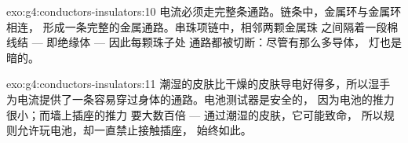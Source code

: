 \begin{solution}{exo:g4:conductors-insulators:10}
电流必须走完整条通路。链条中，金属环与金属环相连，
形成一条完整的金属通路。串珠项链中，相邻两颗金属珠
之间隔着一段棉线结 --- 即绝缘体 --- 因此每颗珠子处
通路都被切断：尽管有那么多导体，
灯也是暗的。
\end{solution}

\begin{solution}{exo:g4:conductors-insulators:11}
潮湿的皮肤比干燥的皮肤导电好得多，所以湿手
为电流提供了一条容易穿过身体的通路。电池测试器是安全的，
因为电池的推力很小；而墙上插座的推力
要大数百倍 --- 通过潮湿的皮肤，它可能致命，
所以规则允许玩电池，却一直禁止接触插座，
始终如此。
\end{solution}
